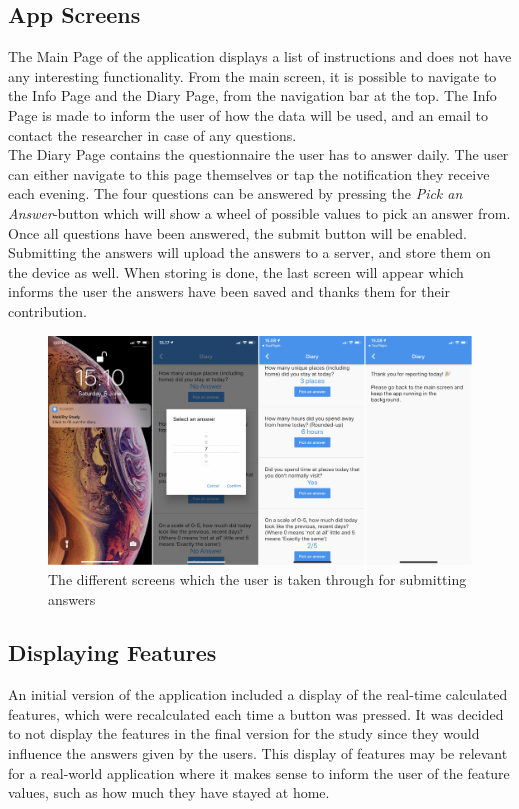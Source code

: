 \subsection{App Screens}
The Main Page of the application displays a list of instructions and does not have any interesting functionality. From the main screen, it is possible to navigate to the Info Page and the Diary Page, from the navigation bar at the top. The Info Page is made to inform the user of how the data will be used, and an email to contact the researcher in case of any questions. \\

The Diary Page contains the questionnaire the user has to answer daily. The user can either navigate to this page themselves or tap the notification they receive each evening. The four questions can be answered by pressing the \textit{Pick an Answer}-button which will show a wheel of possible values to pick an answer from. Once all questions have been answered, the submit button will be enabled. Submitting the answers will upload the answers to a server, and store them on the device as well. When storing is done, the last screen will appear which informs the user the answers have been saved and thanks them for their contribution.

\begin{figure}
    \centering
    \includegraphics[width=\textwidth]{images/app_imgs/screens-answers.pdf}
    \caption{The different screens which the user is taken through for submitting answers}
    \label{fig:screens-answers}
\end{figure}

\subsection{Displaying Features}
An initial version of the application included a display of the real-time calculated features, which were recalculated each time a button was pressed. It was decided to not display the features in the final version for the study since they would influence the answers given by the users. This display of features may be relevant for a real-world application where it makes sense to inform the user of the feature values, such as how much they have stayed at home.

